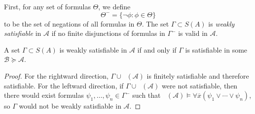\documentclass{article}
\DeclareMathOperator{\Diagel}{Diag_{el}}
\let\mc\mathcal
\begin{document}
\begin{definition}
    First, for any set of formulas $\Theta$, we define
    \[ \Theta^{-} = \{ \neg \phi : \phi \in \Theta \} \]
    to be the set of negations of all formulas in $\Theta$. The set $\Gamma \subset S(A)$ is \textit{weakly satisfiable} in $\mc{A}$ if no finite disjunctions of formulas in $\Gamma^{-}$ is valid in $\mc{A}$.
\end{definition}

\begin{remark}\label{wSat}
    A set $\Gamma \subset S(A)$ is weakly satisfiable in $\mc{A}$ if and only if $\Gamma$ is satisfiable in some $\mc{B} \succeq \mc{A}$.
\end{remark}
\begin{proof}
    For the rightward direction, $\Gamma \cup \Diagel(\mc{A})$ is finitely satisfiable and therefore satisfiable. For the leftward direction, if $\Gamma \cup \Diagel(\mc{A})$ were not satisfiable, then there would exist formulas $\psi_1, \ldots, \psi_n \in \Gamma^{-}$ such that $\Diagel(\mc{A}) \vDash \forall \overline{x} (\psi_1 \lor \cdots \lor \psi_n)$, so $\Gamma$ would not be weakly satisfiable in $\mc{A}$.
\end{proof}
\end{document}
